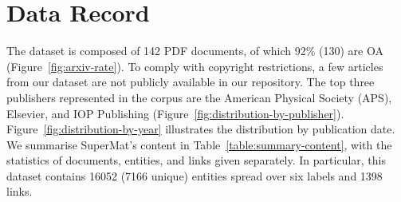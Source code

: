 \section{Data Record}
\label{sec:data-record}
The dataset is composed of 142 PDF documents, of which 92\% (130) are OA (Figure~\ref{fig:arxiv-rate}).
To comply with copyright restrictions, a few articles from our dataset are not publicly available in our repository. 
The top three publishers represented in the corpus are the American Physical Society (APS), Elsevier, and IOP Publishing (Figure~\ref{fig:distribution-by-publisher}).
Figure~\ref{fig:distribution-by-year} illustrates the distribution by publication date.
We summarise SuperMat's content in Table~\ref{table:summary-content}, with the statistics of documents, entities, and links given separately. In particular, this dataset contains 16052 (7166 unique) entities spread over six labels and 1398 links. 

